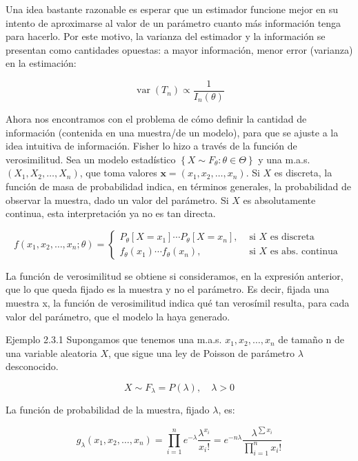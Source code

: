 \documentclass[
]{article}
\begin{document}
Una idea bastante razonable es esperar que un estimador funcione mejor en su intento de aproximarse al valor de un parámetro cuanto más información tenga para hacerlo. Por este motivo, la varianza del estimador y la información se presentan como cantidades opuestas: a mayor información, menor error (varianza) en la estimación:

\[
\operatorname{var}\left(T_{n}\right) \propto \frac{1}{I_{n}(\theta)}
\]

Ahora nos encontramos con el problema de cómo definir la cantidad de información (contenida en una muestra/de un modelo), para que se ajuste a la idea intuitiva de información. Fisher lo hizo a través de la función de verosimilitud.
Sea un modelo estadístico \(\left\{X \sim F_{\theta}: \theta \in \Theta\right\}\) y una m.a.s. \(\left(X_{1}, X_{2}, \ldots, X_{n}\right)\), que toma valores \(\mathbf{x}=\left(x_{1}, x_{2}, \ldots, x_{n}\right)\). Si \(X\) es discreta, la función de masa de probabilidad indica, en términos generales, la probabilidad de observar la muestra, dado un valor del parámetro. Si \(X\) es absolutamente continua, esta interpretación ya no es tan directa.

\[
f\left(x_{1}, x_{2}, \ldots, x_{n} ; \theta\right)= \begin{cases}P_{\theta}\left[X=x_{1}\right] \cdots P_{\theta}\left[X=x_{n}\right], & \text { si } X \text { es discreta } \\ f_{\theta}\left(x_{1}\right) \cdots f_{\theta}\left(x_{n}\right), & \text { si } X \text { es abs. continua }\end{cases}
\]

La función de verosimilitud se obtiene si consideramos, en la expresión anterior, que lo que queda fijado es la muestra y no el parámetro. Es decir, fijada una muestra x, la función de verosimilitud indica qué tan verosímil resulta, para cada valor del parámetro, que el modelo la haya generado.

Ejemplo 2.3.1 Supongamos que tenemos una m.a.s. \(x_{1}, x_{2}, \ldots, x_{n}\) de tamaño n de una variable aleatoria \(X\), que sigue una ley de Poisson de parámetro \(\lambda\) desconocido.

\[
X \sim F_{\lambda}=P(\lambda), \quad \lambda>0
\]

La función de probabilidad de la muestra, fijado \(\lambda\), es:

\[
g_{\lambda}\left(x_{1}, x_{2}, \ldots, x_{n}\right)=\prod_{i=1}^{n} e^{-\lambda} \frac{\lambda^{x_{i}}}{x_{i}!}=e^{-n \lambda} \frac{\lambda^{\sum x_{i}}}{\prod_{i=1}^{n} x_{i}!}
\]
\end{document}
